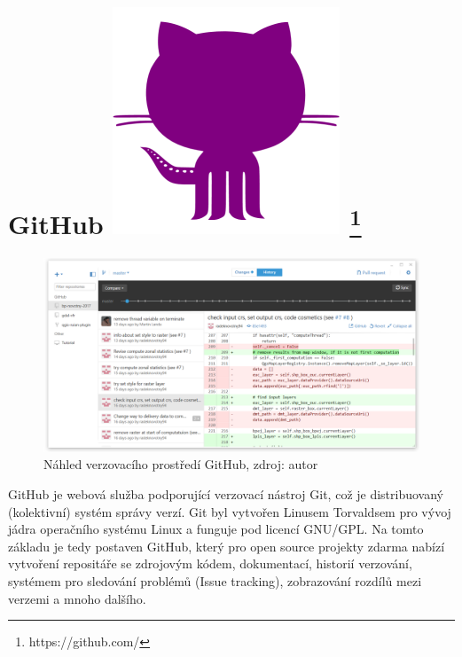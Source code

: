 \section[GitHub]{GitHub \includegraphics[scale=0.06]{./pictures/github.png} 
\footnote{https://github.com/}}
\label{github}
\begin{figure}[H]
    \centering \includegraphics[scale=0.45]{./pictures/github_screen.png}
      \caption[Náhled verzovacího prostředí GitHub]
      {Náhled verzovacího prostředí GitHub, zdroj: autor}
      \label{screen:github}
\end{figure}
GitHub je webová služba podporující verzovací nástroj Git, což je
distribuovaný (kolektivní) systém správy verzí. Git byl vytvořen
Linusem Torvaldsem pro vývoj jádra operačního systému Linux a funguje
pod licencí GNU/GPL. Na tomto základu je tedy postaven GitHub, který
pro open source projekty zdarma nabízí vytvoření repositáře se
zdrojovým kódem, dokumentací, historií verzování, systémem pro
sledování problémů (Issue tracking), zobrazování rozdílů mezi verzemi
a mnoho dalšího.\cite{introducingGithub}


